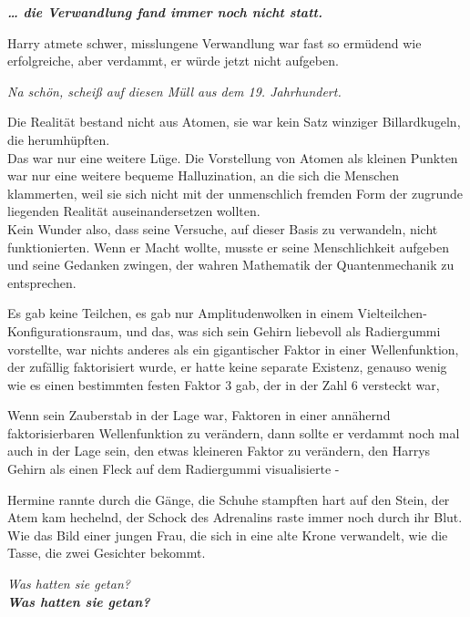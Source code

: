 {\textbf{\emph{… die Verwandlung fand immer noch nicht statt.}}

Harry atmete schwer, misslungene Verwandlung war fast so ermüdend wie erfolgreiche, aber verdammt, er würde jetzt nicht aufgeben.

\emph{Na schön, scheiß auf diesen Müll aus dem 19. Jahrhundert.}

Die Realität bestand nicht aus Atomen, sie war kein Satz winziger Billardkugeln, die herumhüpften.\\ Das war nur eine weitere Lüge. Die Vorstellung von Atomen als kleinen Punkten war nur eine weitere bequeme Halluzination, an die sich die Menschen klammerten, weil sie sich nicht mit der unmenschlich fremden Form der zugrunde liegenden Realität auseinandersetzen wollten.\\ Kein Wunder also, dass seine Versuche, auf dieser Basis zu verwandeln, nicht funktionierten. Wenn er Macht wollte, musste er seine Menschlichkeit aufgeben und seine Gedanken zwingen, der wahren Mathematik der Quantenmechanik zu entsprechen.

Es gab keine Teilchen, es gab nur Amplitudenwolken in einem Vielteilchen-Konfigurationsraum, und das, was sich sein Gehirn liebevoll als Radiergummi vorstellte, war nichts anderes als ein gigantischer Faktor in einer Wellenfunktion, der zufällig faktorisiert wurde, er hatte keine separate Existenz, genauso wenig wie es einen bestimmten festen Faktor 3 gab, der in der Zahl 6 versteckt war,

Wenn sein Zauberstab in der Lage war, Faktoren in einer annähernd faktorisierbaren Wellenfunktion zu verändern, dann sollte er verdammt noch mal auch in der Lage sein, den etwas kleineren Faktor zu verändern, den Harrys Gehirn als einen Fleck auf dem Radiergummi visualisierte -

Hermine rannte durch die Gänge, die Schuhe stampften hart auf den Stein, der Atem kam hechelnd, der Schock des Adrenalins raste immer noch durch ihr Blut. Wie das Bild einer jungen Frau, die sich in eine alte Krone verwandelt, wie die Tasse, die zwei Gesichter bekommt.

\emph{Was hatten sie getan?}\\ \textbf{\emph{Was hatten sie getan?}}

}
